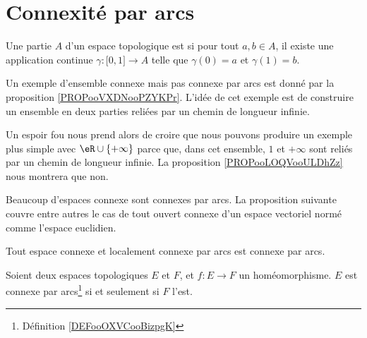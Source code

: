 
\section{Connexité par arcs}

\begin{definition}      \label{DEFooOXVCooBizpgK}
	Une partie \( A\) d'un espace topologique est  si pour tout \( a,b \in A\), il existe une application continue \( \gamma\colon \mathopen[ 0 , 1 \mathclose]\to A\) telle que \( \gamma(0)=a\) et \( \gamma(1)=b\).
\end{definition}

\begin{normaltext}
	Un exemple d'ensemble connexe mais pas connexe par arcs est donné par la proposition \ref{PROPooVXDNooPZYKPr}. L'idée de cet exemple est de construire un ensemble en deux parties reliées par un chemin de longueur infinie.

	Un espoir fou nous prend alors de croire que nous pouvons produire un exemple plus simple avec \( \eR\cup\{ +\infty \}\) parce que, dans cet ensemble, \( 1\) et \( +\infty\) sont reliés par un chemin de longueur infinie. La proposition \ref{PROPooLOQVooULDhZz} nous montrera que non.
\end{normaltext}

Beaucoup d'espaces connexe sont connexes par arcs. La proposition suivante couvre entre autres le cas de tout ouvert connexe d'un espace vectoriel normé comme l'espace euclidien.

\begin{proposition}       \label{PROPooYFDBooHbBjzF}
     Tout espace connexe et localement connexe par arcs est connexe par arcs.
\end{proposition}


\begin{lemma}       \label{LEMooTVQMooFxrFaT}
	Soient deux espaces topologiques \( E\) et \( F\), et \( f : E\to F\) un homéomorphisme. \( E\) est connexe par arcs\footnote{Définition \ref{DEFooOXVCooBizpgK}} si et
	seulement si \( F\) l'est.
\end{lemma}

